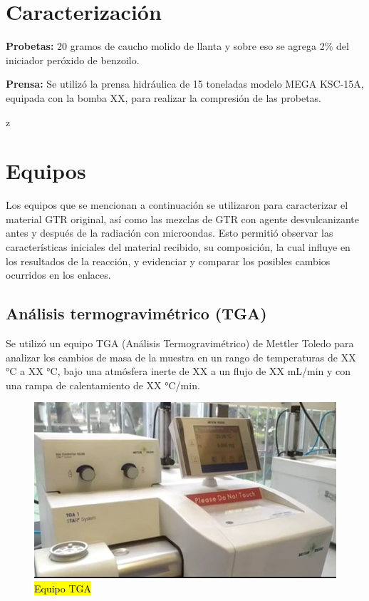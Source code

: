 \begin{multicols}{2}
\section{Caracterización}



\textbf{Probetas:} 20 gramos de caucho molido de llanta y sobre eso se agrega 2\% del iniciador peróxido de benzoilo.

\textbf{Prensa:} Se utilizó la prensa hidráulica de 15 toneladas modelo MEGA KSC-15A, equipada con la bomba XX, para realizar la compresión de las probetas.

z

\section{Equipos}

Los equipos que se mencionan a continuación se utilizaron para caracterizar el material GTR original, así como las mezclas de GTR con agente desvulcanizante antes y después de la radiación con microondas. Esto permitió observar las características iniciales del material recibido, su composición, la cual influye en los resultados de la reacción, y evidenciar y comparar los posibles cambios ocurridos en los enlaces.


\subsection{Análisis termogravimétrico (TGA)}
Se utilizó un equipo TGA (Análisis Termogravimétrico) de Mettler Toledo para analizar los cambios de masa de la muestra en un rango de temperaturas de XX °C a XX °C, bajo una atmósfera inerte de XX a un flujo de XX mL/min y con una rampa de calentamiento de XX °C/min.

\begin{figure}[H]
    \centering
\includegraphics[scale=0.55]{00Figuras/TGA.png}
    \caption{\hl{Equipo TGA}}
    \label{TGA}
\end{figure}


\end{multicols}

